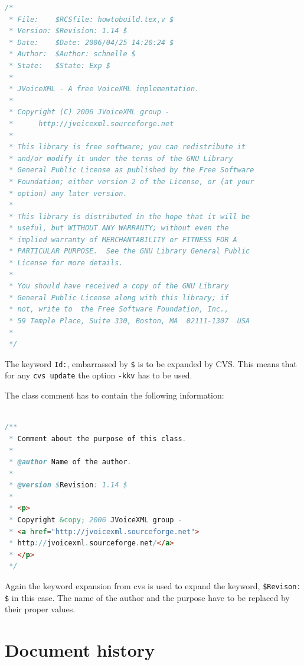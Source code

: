 \documentclass[11pt,a4paper]{article}
\begin{document}
\begin{lstlisting}[language=Java]
/*
 * File:    $RCSfile: howtobuild.tex,v $
 * Version: $Revision: 1.14 $
 * Date:    $Date: 2006/04/25 14:20:24 $
 * Author:  $Author: schnelle $
 * State:   $State: Exp $
 *
 * JVoiceXML - A free VoiceXML implementation.
 *
 * Copyright (C) 2006 JVoiceXML group - 
 *      http://jvoicexml.sourceforge.net
 *
 * This library is free software; you can redistribute it 
 * and/or modify it under the terms of the GNU Library 
 * General Public License as published by the Free Software 
 * Foundation; either version 2 of the License, or (at your 
 * option) any later version.
 *
 * This library is distributed in the hope that it will be 
 * useful, but WITHOUT ANY WARRANTY; without even the 
 * implied warranty of MERCHANTABILITY or FITNESS FOR A 
 * PARTICULAR PURPOSE.  See the GNU Library General Public 
 * License for more details.
 *
 * You should have received a copy of the GNU Library 
 * General Public License along with this library; if 
 * not, write to  the Free Software Foundation, Inc., 
 * 59 Temple Place, Suite 330, Boston, MA  02111-1307  USA
 *
 */
\end{lstlisting}

The keyword \texttt{Id:}, embarrassed by \texttt{\$} is to be expanded by CVS. 
This means that for any \texttt{cvs update} the option \texttt{-kkv} has to
be used.

The class comment has to contain the following information:

\begin{lstlisting}[language=Java]

/**
 * Comment about the purpose of this class.
 *
 * @author Name of the author.
 *
 * @version $Revision: 1.14 $
 *
 * <p>
 * Copyright &copy; 2006 JVoiceXML group -
 * <a href="http://jvoicexml.sourceforge.net">
 * http://jvoicexml.sourceforge.net/</a>
 * </p>
 */
\end{lstlisting}

Again the keyword expansion from cvs is used to expand the keyword,
\texttt{\$Revison: \$} in this case. The name of the author and the 
purpose have to be replaced by their proper values.

\section*{Document history}
\end{document}
